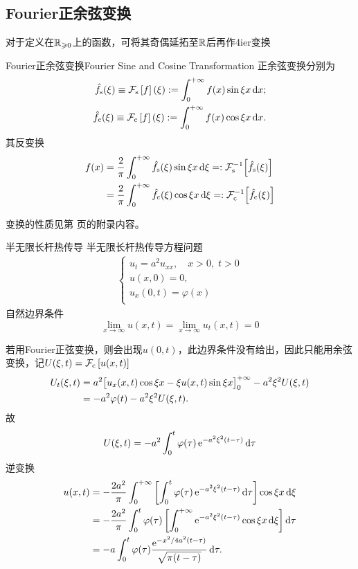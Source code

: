 \subsection{Fourier正余弦变换}
对于定义在$\RR_{\geqslant  0}$上的函数，可将其奇偶延拓至$\RR$后再作4ier变换
\begin{definition}{Fourier正余弦变换}{Fourier Sine and Cosine Transformation}
	正余弦变换分别为
	\begin{align*}
		\hat f_\sine(\xi)\equiv\cf[s]f(\xi):=\int\zti f(x)\sin\xi x\d x;\\
		\hat f_\cosi(\xi)\equiv\cf[c]f(\xi):=\int\zti f(x)\cos\xi x\d x.
	\end{align*}
	其反变换
	\begin{align*}
		f(x)&=\frac2\pi\int\zti\hat f_\sine(\xi)\sin\xi x\d\xi=:\cfi[s]{\hat f_\sine(\xi)}\\
		&=\frac2\pi\int\zti\hat f_\cosi(\xi)\cos\xi x\d\xi=:\cfi[c]{\hat f_\cosi(\xi)}
	\end{align*}
\end{definition}
变换的性质见第 \pageref{The Property of Sine and Cosine Transformation} 页的附录内容。
\begin{example}{半无限长杆热传导}{}
	半无限长杆热传导方程问题
	\begin{align*}
		\begin{cases}
			u_t=a^2u_{xx},\quad x>0,\;t>0\\
			u(x,0)=0,\\
			u_x(0,t)=\varphi(x)\\
		\end{cases}
	\end{align*}
	自然边界条件
	\[
		\lim_{x\to\infty}u(x,t)=\lim_{x\to\infty}u_t(x,t)=0
	\]
	
	若用Fourier正弦变换，则会出现$u(0,t)$，此边界条件没有给出，因此只能用余弦变换，记$U(\xi,t)=\cf[c]{u(x,t)}$
	\begin{align*}
		U_t(\xi,t)&=a^2\bigfkh{u_x(x,t)\cos\xi x-\xi u(x,t)\sin\xi x}\zti-a^2\xi^2U(\xi,t)\\
		&=-a^2\varphi(t)-a^2\xi^2U(\xi,t).
	\end{align*}
	故
	\[
		U(\xi,t)=-a^2\int_0^t\varphi(\tau)\e{-a^2\xi^2(t-\tau)}\d\tau
	\]
	逆变换
	\begin{align*}
		u(x,t)&=-\frac{2a^2}\pi\int\zti\fkh{\int_0^t\varphi(\tau)\e{-a^2\xi^2(t-\tau)}\d\tau}\cos\xi x\d\xi\\
		&=-\frac{2a^2}\pi\int_0^t\varphi(\tau)\fkh{\int\zti\e{-a^2\xi^2(t-\tau)}\cos\xi x\d\xi}\d\tau\\
		&=-a\int_0^t\varphi(\tau)\frac{\e{-x^2/4a^2(t-\tau)}}{\sqrt{\pi(t-\tau)}}\d\tau.
	\end{align*}
\end{example}
